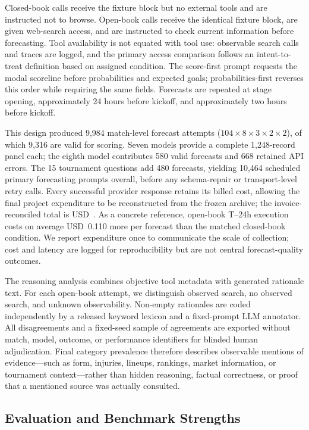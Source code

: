Closed-book calls receive the fixture block but no external tools and are instructed not to browse.
Open-book calls receive the identical fixture block, are given web-search access, and are instructed
to check current information before forecasting. Tool availability is not equated with tool use:
observable search calls and traces are logged, and the primary access comparison follows an
intent-to-treat definition based on assigned condition. The score-first prompt requests the modal
scoreline before probabilities and expected goals; probabilities-first reverses this order while
requiring the same fields. Forecasts are repeated at stage opening, approximately 24 hours before
kickoff, and approximately two hours before kickoff.

This design produced 9,984 match-level forecast attempts
($104\times8\times3\times2\times2$), of which 9,316 are valid for scoring. Seven models provide a
complete 1,248-record panel each; the eighth model contributes 580 valid forecasts and 668 retained
API errors. The 15 tournament questions add 480 forecasts, yielding 10,464 scheduled primary
forecasting prompts overall, before any schema-repair or transport-level retry calls. Every successful
provider response retains its billed cost, allowing the final project expenditure to be reconstructed
from the frozen archive; the invoice-reconciled total is
USD~. As a concrete reference, open-book T--24h execution costs on
average USD~0.110 more per forecast than the matched closed-book condition. We report expenditure
once to communicate the scale of collection; cost and latency are logged for reproducibility but are
not central forecast-quality outcomes.

The reasoning analysis combines objective tool metadata with generated rationale text. For each
open-book attempt, we distinguish observed search, no observed search, and unknown observability.
Non-empty rationales are coded independently by a released keyword lexicon and a fixed-prompt LLM
annotator. All disagreements and a fixed-seed sample of agreements are exported without match,
model, outcome, or performance identifiers for blinded human adjudication. Final category prevalence
therefore describes observable mentions of evidence---such as form, injuries, lineups, rankings,
market information, or tournament context---rather than hidden reasoning, factual correctness, or
proof that a mentioned source was actually consulted.

\subsection{Evaluation and Benchmark Strengths}
\label{sec:benchmark-strengths}

